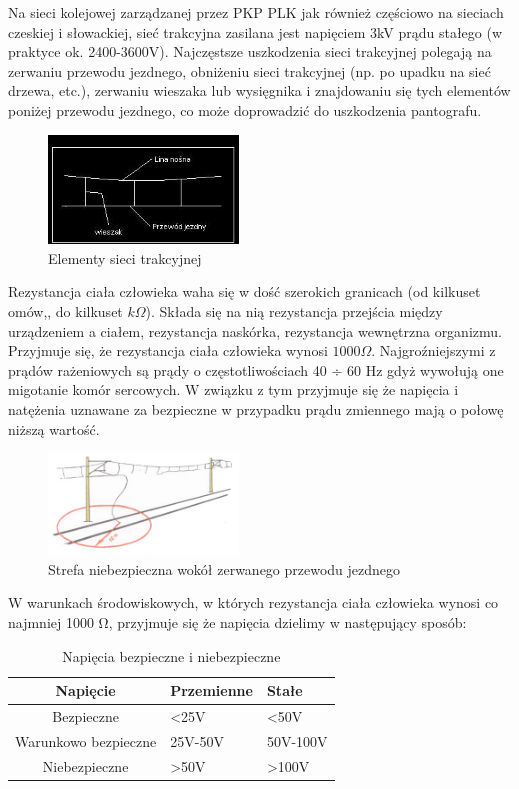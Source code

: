 Na sieci kolejowej zarządzanej przez PKP PLK jak również częściowo na sieciach czeskiej i słowackiej, sieć trakcyjna zasilana jest napięciem 3kV prądu stałego (w praktyce ok. 2400-3600V). Najczęstsze uszkodzenia sieci trakcyjnej polegają na zerwaniu przewodu jezdnego, obniżeniu sieci trakcyjnej (np. po upadku na sieć drzewa, etc.), zerwaniu wieszaka lub wysięgnika i znajdowaniu się tych elementów poniżej przewodu jezdnego, co może doprowadzić do uszkodzenia pantografu.
\begin{figure}[h]
	\includegraphics[width=0.45\textwidth]{skryptkierownik-img/siec-jezdna.jpg}
	\caption{Elementy sieci trakcyjnej}
\end{figure}
Rezystancja ciała człowieka waha się w dość szerokich granicach (od kilkuset omów,, do kilkuset $k\Omega$). Składa się na nią rezystancja przejścia między urządzeniem a ciałem, rezystancja naskórka, rezystancja wewnętrzna organizmu. Przyjmuje się, że rezystancja ciała człowieka wynosi $1000\Omega$. Najgroźniejszymi z prądów rażeniowych są prądy o częstotliwościach 40 ÷ 60 Hz gdyż wywołują one migotanie komór sercowych. W związku z tym przyjmuje się że napięcia i natężenia uznawane za bezpieczne w przypadku prądu zmiennego mają o połowę niższą wartość.
\begin{figure}
	\includegraphics[width=0.45\textwidth]{skryptkierownik-img/strefa-niebezpieczna-trakcja-10.jpg}
	\caption{Strefa niebezpieczna wokół zerwanego przewodu jezdnego}
	\label{fig:przewod}
\end{figure}
W warunkach środowiskowych, w których rezystancja ciała człowieka wynosi co najmniej 1000 Ω, przyjmuje się że napięcia dzielimy w następujący sposób:
\begin{table}
	\begin{tabular}{|c|m{2.5cm}|m{2.5cm}|}
		\hline
		Napięcie&Przemienne& Stałe\\
		\hline
		Bezpieczne &<25V &<50V\\
		\hline
		Warunkowo bezpieczne &25V-50V &50V-100V\\
		\hline
		Niebezpieczne	&>50V	&>100V\\
		\hline
	\end{tabular}
	\caption{Napięcia bezpieczne i niebezpieczne}
\end{table}

